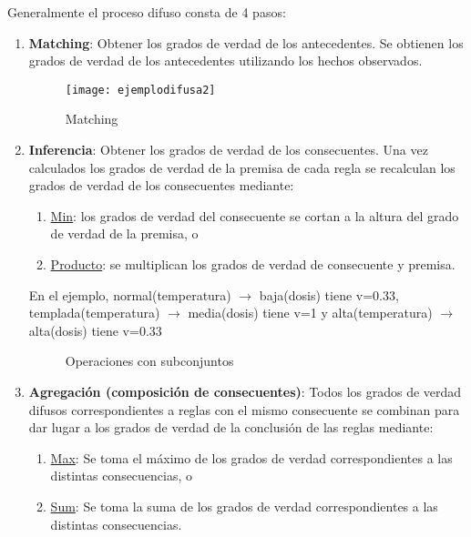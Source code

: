 \documentclass[12pt]{article}
\begin{document}
Generalmente el proceso difuso consta de 4 pasos:
\begin{enumerate}
\item \textbf{Matching}: Obtener los grados de verdad de los antecedentes. Se obtienen los grados de verdad de los antecedentes utilizando los hechos observados.
\begin{figure}[H]
\centering
\texttt{[image: ejemplodifusa2]}
\caption{Matching}
\label{fig:ejemplodifusa2}
\end{figure}
\item \textbf{Inferencia}: Obtener los grados de verdad de los consecuentes. Una vez calculados los grados de verdad de la premisa de cada regla se recalculan los grados de verdad de los consecuentes mediante:
\begin{enumerate}
\item \underline{Min}: los grados de verdad del consecuente se cortan a la altura del grado de verdad de la premisa, o
\item \underline{Producto}: se multiplican los grados de verdad de consecuente y premisa.
\end{enumerate}
En el ejemplo, normal(temperatura) $\rightarrow$ baja(dosis) tiene v=0.33, templada(temperatura) $\rightarrow$ media(dosis) tiene v=1 y alta(temperatura) $\rightarrow$ alta(dosis) tiene v=0.33
\begin{figure}[H]
 \centering
 \caption{Operaciones con subconjuntos}
 \label{f:ejemplodifusa3}
\end{figure}

\item \textbf{Agregación (composición de consecuentes)}: Todos los grados de verdad difusos correspondientes a reglas con el mismo consecuente se combinan para dar lugar a los grados de verdad de la conclusión de las reglas mediante:
\begin{enumerate}
\item \underline{Max}: Se toma el máximo de los grados de verdad correspondientes a las distintas consecuencias, o
\item \underline{Sum}: Se toma la suma de los grados de verdad correspondientes a las distintas consecuencias.
\end{enumerate}


\end{enumerate}
\end{document}

